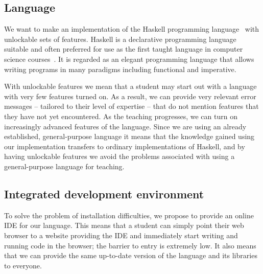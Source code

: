 \subsection{Language} \label{sec:Language}

We want to make an implementation of the Haskell programming
language~\cite{marlow2010haskell} with unlockable sets of features.  Haskell is
a declarative programming language suitable and often preferred for use as the
first taught language in computer science courses~\cite{dijkstra2001members}.
It is regarded as an elegant programming language that allows writing programs
in many paradigms including functional and imperative.

With unlockable features we mean that a student may start out with a language
with very few features turned on. As a result, we can provide very relevant
error messages -- tailored to their level of expertise -- that do not mention
features that they have not yet encountered. As the teaching progresses, we can
turn on increasingly advanced features of the language.  Since we are using an
already established, general-purpose language it means that the knowledge
gained using our implementation transfers to ordinary implementations of
Haskell, and by having unlockable features we avoid the problems associated
with using a general-purpose language for teaching.

\subsection{Integrated development environment} \label{sec:IDE}

To solve the problem of installation difficulties, we propose to provide an
online IDE for our language.  This means that a student can simply point their
web browser to a website providing the IDE and immediately start writing and
running code in the browser; the barrier to entry is extremely low. It also
means that we can provide the same up-to-date version of the language and its
libraries to everyone.


